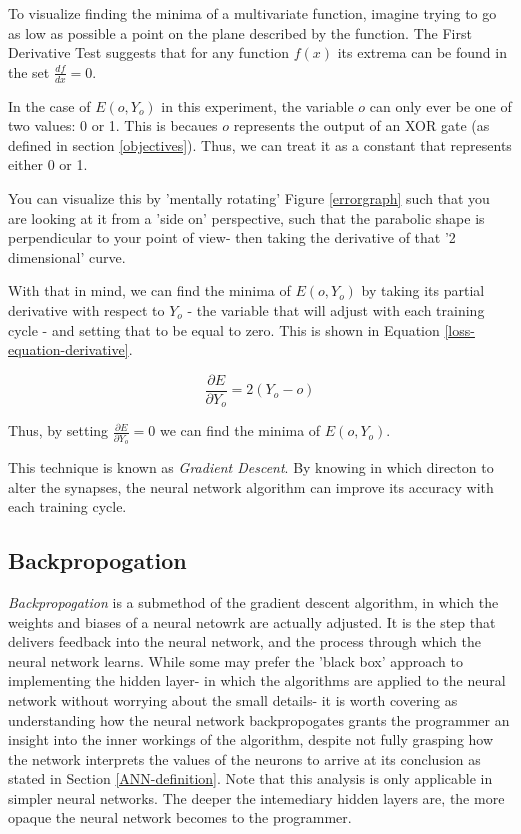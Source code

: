 \documentclass[12pt]{article}
\begin{document}
To visualize finding the minima of a multivariate function, imagine trying to go as low as possible a point on the plane described by the function. The First Derivative Test suggests that for any function $f(x)$ its extrema can be found in the set $\frac{df}{dx} = 0$.

In the case of \(E(o, Y_o)\) in this experiment, the variable $o$ can only ever be one of two values: 0 or 1. This is becaues $o$ represents the output of an XOR gate (as defined in section \ref{objectives}). Thus, we can treat it as a constant that represents either 0 or 1.

You can visualize this by 'mentally rotating' Figure \ref{errorgraph} such that you are looking at it from a 'side on' perspective, such that the parabolic shape is perpendicular to your point of view- then taking the derivative of that '2 dimensional' curve.

With that in mind, we can find the minima of $E(o, Y_o)$ by taking its partial derivative with respect to $Y_o$ - the variable that will adjust with each training cycle -  and setting that to be equal to zero. This is shown in Equation \ref{loss-equation-derivative}.

\begin{equation} \label{loss-equation-derivative}
    \frac{\partial E}{\partial Y_o} = 2 (Y_o  - o)
\end{equation}

Thus, by setting $\frac{\partial E}{\partial Y_o} = 0$ we can find the minima of $E(o, Y_o)$.

This technique is known as \textit{Gradient Descent}. By knowing in which directon to alter the synapses, the neural network algorithm can improve its accuracy with each training cycle.

\subsection{Backpropogation \label{backprop}}

\textit{Backpropogation} is a submethod of the gradient descent algorithm, in which the weights and biases of a neural netowrk are actually adjusted. It is the step that delivers feedback into the neural network, and the process through which the neural network learns. While some may prefer the 'black box' approach to implementing the hidden layer- in which the algorithms are applied to the neural network without worrying about the small details- it is worth covering as understanding how the neural network backpropogates grants the programmer an insight into the inner workings of the algorithm, despite not fully grasping how the network interprets the values of the neurons to arrive at its conclusion as stated in Section \ref{ANN-definition}. Note that this analysis is only applicable in simpler neural networks. The deeper the intemediary hidden layers are, the more opaque the neural network becomes to the programmer.
\end{document}
